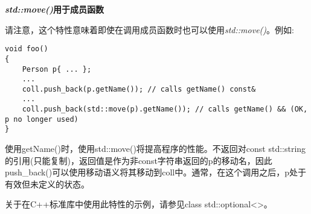 \hspace*{\fill} \par %
\textbf{\textit{std::move()}用于成员函数}

请注意，这个特性意味着即使在调用成员函数时也可以使用\textit{std::move()}。例如:\par

\begin{lstlisting}[caption={}]
void foo()
{
	Person p{ ... };
	...
	coll.push_back(p.getName()); // calls getName() const&
	...
	coll.push_back(std::move(p).getName()); // calls getName() && (OK, p no longer used)
}
\end{lstlisting}

使用getName()时，使用std::move()将提高程序的性能。不返回对const std::string的引用(只能复制)，返回值是作为非const字符串返回的p的移动名，因此push\_back()可以使用移动语义将其移动到coll中。通常，在这个调用之后，p处于有效但未定义的状态。\par

关于在C++标准库中使用此特性的示例，请参见class std::optional<>。\par
















